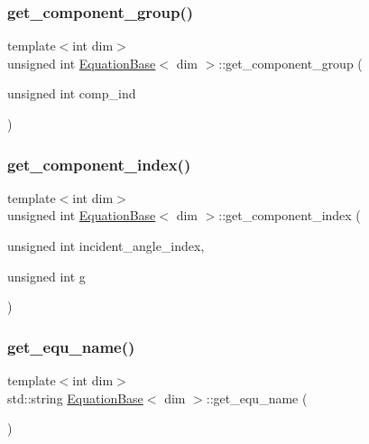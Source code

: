 \subsubsection{\texorpdfstring{get\+\_\+component\+\_\+group()}{get\_component\_group()}}
{\footnotesize\ttfamily template$<$int dim$>$ \\
unsigned int \hyperlink{class_equation_base}{Equation\+Base}$<$ dim $>$\+::get\+\_\+component\+\_\+group (\begin{DoxyParamCaption}\item[{unsigned int}]{comp\+\_\+ind }\end{DoxyParamCaption})\hspace{0.3cm}{\ttfamily [virtual]}}

\mbox{\label{class_equation_base_a03a5a22088edb15689e0041dcc6d323c}} 
\subsubsection{\texorpdfstring{get\+\_\+component\+\_\+index()}{get\_component\_index()}}
{\footnotesize\ttfamily template$<$int dim$>$ \\
unsigned int \hyperlink{class_equation_base}{Equation\+Base}$<$ dim $>$\+::get\+\_\+component\+\_\+index (\begin{DoxyParamCaption}\item[{unsigned int}]{incident\+\_\+angle\+\_\+index,  }\item[{unsigned int}]{g }\end{DoxyParamCaption})\hspace{0.3cm}{\ttfamily [virtual]}}

\mbox{\label{class_equation_base_abc4842a38ebb180b57ae11ec1325535c}} 
\subsubsection{\texorpdfstring{get\+\_\+equ\+\_\+name()}{get\_equ\_name()}}
{\footnotesize\ttfamily template$<$int dim$>$ \\
std\+::string \hyperlink{class_equation_base}{Equation\+Base}$<$ dim $>$\+::get\+\_\+equ\+\_\+name (\begin{DoxyParamCaption}{ }\end{DoxyParamCaption})}

